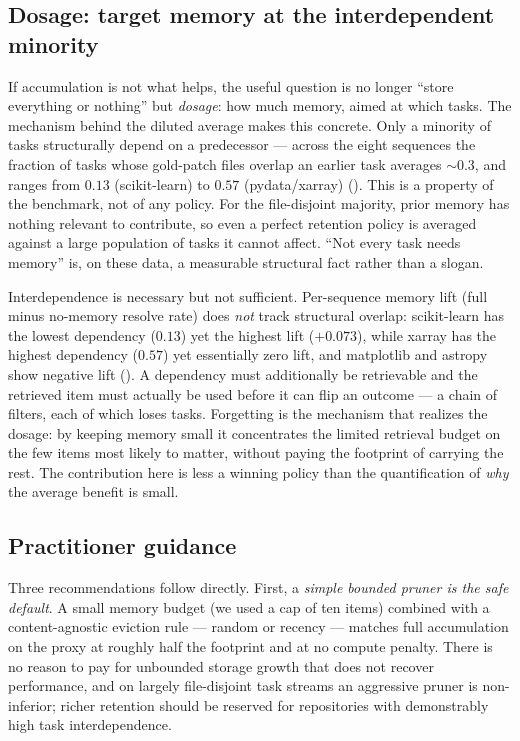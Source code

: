 \subsection{Dosage: target memory at the interdependent minority}

If accumulation is not what helps, the useful question is no longer ``store
everything or nothing'' but \emph{dosage}: how much memory, aimed at which tasks.
The mechanism behind the diluted average makes this concrete. Only a minority of
tasks structurally depend on a predecessor --- across the eight sequences the
fraction of tasks whose gold-patch files overlap an earlier task averages
$\sim\!0.3$, and ranges from $0.13$ (scikit-learn) to $0.57$ (pydata/xarray)
(). This is a property of the benchmark, not of any
policy. For the file-disjoint majority, prior memory has nothing relevant to
contribute, so even a perfect retention policy is averaged against a large
population of tasks it cannot affect. ``Not every task needs memory'' is, on these
data, a measurable structural fact rather than a slogan.

Interdependence is necessary but not sufficient. Per-sequence memory lift (full
minus no-memory resolve rate) does \emph{not} track structural overlap: scikit-learn
has the lowest dependency ($0.13$) yet the highest lift ($+0.073$), while xarray has
the highest dependency ($0.57$) yet essentially zero lift, and matplotlib and
astropy show negative lift (). A dependency must additionally
be retrievable and the retrieved item must actually be used before it can flip an
outcome --- a chain of filters, each of which loses tasks. Forgetting is the
mechanism that realizes the dosage: by keeping memory small it concentrates the
limited retrieval budget on the few items most likely to matter, without paying the
footprint of carrying the rest. The contribution here is less a winning policy than
the quantification of \emph{why} the average benefit is small.

\subsection{Practitioner guidance}

Three recommendations follow directly. First, a \emph{simple bounded pruner is the
safe default}. A small memory budget (we used a cap of ten items) combined with a
content-agnostic eviction rule --- random or recency --- matches full accumulation
on the proxy at roughly half the footprint and at no compute penalty. There is no
reason to pay for unbounded storage growth that does not recover performance, and on
largely file-disjoint task streams an aggressive pruner is non-inferior; richer
retention should be reserved for repositories with demonstrably high task
interdependence.

